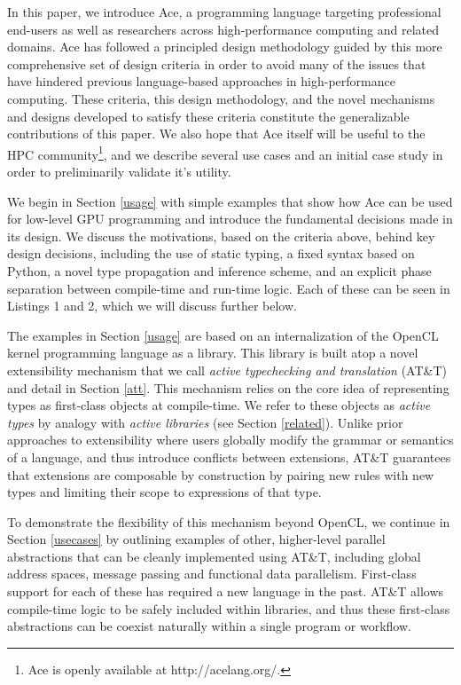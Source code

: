 \documentclass[9pt,preprint]{sigplanconf}
\begin{document}
In this paper, we introduce Ace, a programming language targeting professional end-users as well as researchers across high-performance computing and related domains. Ace has followed a principled design methodology guided by this more comprehensive set of design criteria in order to avoid many of the issues that have hindered previous language-based approaches in high-performance computing. These criteria, this design methodology, and the novel mechanisms and designs developed to satisfy these criteria constitute the generalizable contributions of this paper. We also hope that Ace itself will be useful to the HPC community\footnote{\small Ace is openly available at http://acelang.org/.}, and we describe several use cases and an initial case study in order to preliminarily validate it's utility. 

 We begin in Section \ref{usage} with simple examples that show how Ace can be used for low-level GPU programming and introduce the fundamental decisions made in its design. We discuss the motivations, based on the criteria above, behind key design decisions, including the use of static typing, a fixed syntax based on Python, a novel type propagation and inference scheme, and an explicit phase separation between compile-time and run-time logic. Each of these can be seen in Listings 1 and 2, which we will discuss further below.
 
The examples in Section \ref{usage} are based on an internalization of the OpenCL kernel programming language \cite{opencl11} as a library. This library is built atop a novel extensibility mechanism that we call \emph{active typechecking and translation} (AT\&T) and detail in Section \ref{att}. This mechanism relies on the core idea of representing types as first-class objects at compile-time. We refer to these objects as \emph{active types} by analogy with \emph{active libraries} \cite{activelibraries} (see Section \ref{related}). Unlike prior approaches to extensibility where users globally modify the grammar or semantics of a language, and thus introduce conflicts between extensions, AT\&T guarantees that extensions are composable by construction by pairing new rules with new types and limiting their scope to expressions of that type.

To demonstrate the flexibility of this mechanism beyond OpenCL, we continue in Section \ref{usecases} by outlining examples of other, higher-level parallel abstractions that can be cleanly implemented using AT\&T, including global address spaces, message passing and functional data parallelism. First-class support for each of these has required a new language in the past. AT\&T allows compile-time logic to be safely included within libraries, and thus these first-class abstractions can be coexist naturally within a single program or workflow.
\end{document}
